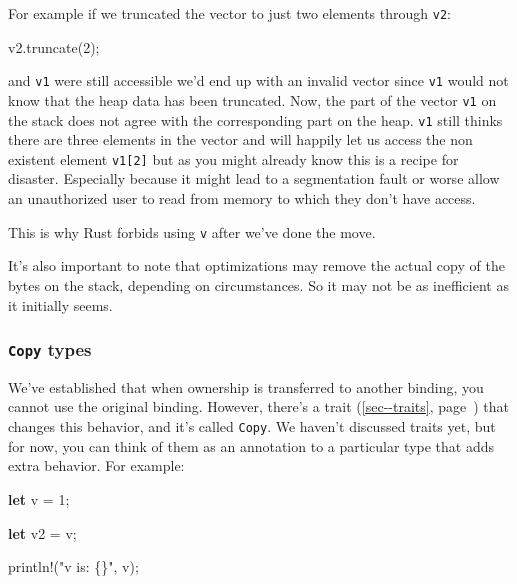 \documentclass[a4paper,]{book}
\renewcommand*{\hyperref}[2][\ar]{%
  \def\ar{#2}%
  #2 (\autoref{#1}, page~\pageref{#1})}
\newenvironment{Shaded}{\begin{snugshade}}{\end{snugshade}}
\newcommand{\KeywordTok}[1]{\textcolor[rgb]{0.13,0.29,0.53}{\textbf{{#1}}}}
\newcommand{\DecValTok}[1]{\textcolor[rgb]{0.00,0.00,0.81}{{#1}}}
\newcommand{\StringTok}[1]{\textcolor[rgb]{0.31,0.60,0.02}{{#1}}}
\newcommand{\OtherTok}[1]{\textcolor[rgb]{0.56,0.35,0.01}{{#1}}}
\newcommand{\NormalTok}[1]{{#1}}
\begin{document}
For example if we truncated the vector to just two elements through
\texttt{v2}:

\begin{Shaded}
\begin{Highlighting}[]
\NormalTok{v2.truncate(}\DecValTok{2}\NormalTok{);}
\end{Highlighting}
\end{Shaded}

and \texttt{v1} were still accessible we'd end up with an invalid vector
since \texttt{v1} would not know that the heap data has been truncated.
Now, the part of the vector \texttt{v1} on the stack does not agree with
the corresponding part on the heap. \texttt{v1} still thinks there are
three elements in the vector and will happily let us access the non
existent element \texttt{v1{[}2{]}} but as you might already know this
is a recipe for disaster. Especially because it might lead to a
segmentation fault or worse allow an unauthorized user to read from
memory to which they don't have access.

This is why Rust forbids using \texttt{v} after we've done the move.

It's also important to note that optimizations may remove the actual
copy of the bytes on the stack, depending on circumstances. So it may
not be as inefficient as it initially seems.

\subsubsection{\texorpdfstring{\texttt{Copy}
types}{Copy types}}\label{copy-types}

We've established that when ownership is transferred to another binding,
you cannot use the original binding. However, there's a
\hyperref[sec--traits]{trait} that changes this behavior, and it's
called \texttt{Copy}. We haven't discussed traits yet, but for now, you
can think of them as an annotation to a particular type that adds extra
behavior. For example:

\begin{Shaded}
\begin{Highlighting}[]
\KeywordTok{let} \NormalTok{v = }\DecValTok{1}\NormalTok{;}

\KeywordTok{let} \NormalTok{v2 = v;}

\OtherTok{println!}\NormalTok{(}\StringTok{"v is: \{\}"}\NormalTok{, v);}
\end{Highlighting}
\end{Shaded}
\end{document}
